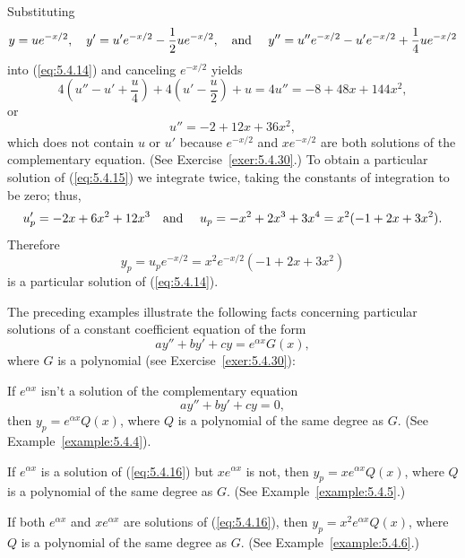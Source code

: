 \begin{examplesolution}
\solution Substituting
\[
  y=ue^{-x/2},\quad y'=u'e^{-x/2}-\frac{1}{2}ue^{-x/2},\mbox{\quad and \quad}y''=u''e^{-x/2}-u'e^{-x/2}+\frac{1}{4}ue^{-x/2}
\]
into (\ref{eq:5.4.14}) and canceling $e^{-x/2}$ yields
\[
  4\left(u''-u'+\frac{u}{4}\right)+4\left(u'-\frac{u}{2}\right)+u=4u''=-8+48x+144x^{2},
\]
or
\begin{equation}
  \label{eq:5.4.15}u''=-2+12x+36x^{2},
\end{equation}
which does not contain $u$ or $u'$ because $e^{-x/2}$ and $xe^{-x/2}$ are both solutions of the
complementary equation. (See Exercise~\ref{exer:5.4.30}.) To obtain a particular solution of
(\ref{eq:5.4.15}) we integrate twice, taking the constants of integration to be zero; thus,
\[
  u_{p}'=-2x+6x^{2}+12x^{3}\mbox{\quad and \quad}u_{p}=-x^{2}+2x^{3}+3x^{4}=x^{2}(-1+2x+3x^{2}).
\]
Therefore
\[
  y_{p}=u_{p}e^{-x/2}=x^{2}e^{-x/2}(-1+2x+3x^{2})
\]
is a particular solution of (\ref{eq:5.4.14}).
\end{examplesolution}


\noindent
The preceding examples illustrate the following facts concerning particular solutions of a constant
coefficient equation of the form
\[
  ay''+by'+cy=e^{\alpha x}G(x),
\]
where $G$ is a polynomial (see Exercise~\ref{exer:5.4.30}):
\begin{alist}
  \item %
  If $e^{\alpha x}$ isn't a solution of the complementary equation
  \begin{equation}
    \label{eq:5.4.16}ay''+by'+cy=0,
  \end{equation}
  then $y_{p}=e^{\alpha x}Q(x)$, where $Q$ is a polynomial of the same degree as $G$. (See
  Example~\ref{example:5.4.4}).

  \item %
  If $e^{\alpha x}$ is a solution of (\ref{eq:5.4.16}) but $xe^{\alpha x}$ is not, then
  $y_{p}=xe^{\alpha x}Q(x)$, where $Q$ is a polynomial of the same degree as $G$. (See
  Example~\ref{example:5.4.5}.)

  \item %
  If both $e^{\alpha x}$ and $xe^{\alpha x}$ are solutions of (\ref{eq:5.4.16}), then
  $y_{p}=x^{2}e^{\alpha x}Q(x)$, where $Q$ is a polynomial of the same degree as $G$. (See
  Example~\ref{example:5.4.6}.)
\end{alist}

